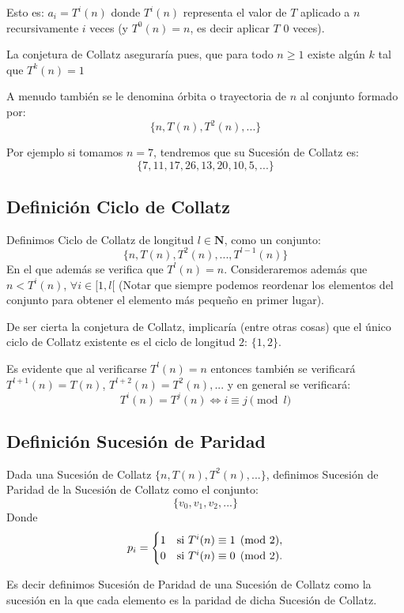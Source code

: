 Esto es: $a_i=T^i(n)$ donde $T^i(n)$ representa el valor de $T$ aplicado a $n$ recursivamente $i$ veces (y $T^0(n) = n$, es decir aplicar $T$ $0$ veces).

La conjetura de Collatz aseguraría pues, que para todo $n\geq1$ existe algún $k$ tal que $T^k(n)=1$

A menudo también se le denomina órbita o trayectoria de $n$ al conjunto formado por:
$$ \{ n, T(n), T^2(n), ... \} $$

Por ejemplo si tomamos $n=7$, tendremos que su Sucesión de Collatz es:
$$\{7, 11, 17, 26, 13, 20, 10, 5, ... \}$$



\subsection{Definición Ciclo de Collatz}

Definimos Ciclo de Collatz de longitud $l\in\mathbf{N}$, como un conjunto:
$$ \{ n, T(n), T^2(n), ..., T^{l-1}(n)\} $$
En el que además se verifica que $T^l(n)=n$.
Consideraremos además que $n< T^i(n)$, $\forall i \in [1,l[$ (Notar que siempre podemos reordenar los elementos del conjunto para obtener el elemento más pequeño en primer lugar).

De ser cierta la conjetura de Collatz, implicaría (entre otras cosas) que el único ciclo de Collatz existente es el ciclo de longitud $2$: $\{ 1, 2 \}$.

Es evidente que al verificarse $T^l(n)=n$ entonces también se verificará $T^{l+1}(n) = T(n)$, $T^{l+2}(n)=T^2(n), ...$ y en general se verificará:
$$T^i(n) = T^j(n) \Longleftrightarrow i \equiv j \pmod l$$

\subsection{Definición Sucesión de Paridad}

Dada una Sucesión de Collatz  $\{ n, T(n), T^2(n), ... \}$, definimos Sucesión de Paridad de la Sucesión de Collatz como el conjunto:
$$
    \{ v_0, v_1, v_2, ...\}
$$
Donde 
$$
    p_i = \begin{cases}
    1 & \text{si \ensuremath{T^i(n)\equiv1\pmod2}},\\
    0 & \text{si \ensuremath{T^i(n)\equiv0\pmod2}.}
    \end{cases}
$$

Es decir definimos Sucesión de Paridad de una Sucesión de Collatz como la sucesión en la que cada elemento es la paridad de dicha Sucesión de Collatz.

